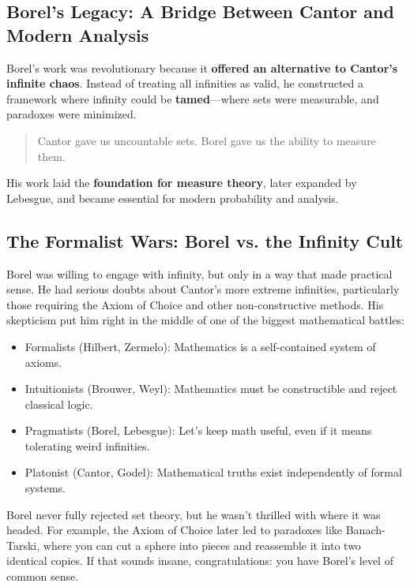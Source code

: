 \subsection{Borel’s Legacy: A Bridge Between Cantor and Modern Analysis}

Borel’s work was revolutionary because it \textbf{offered an alternative to Cantor’s infinite chaos}. Instead of treating all infinities as valid, he constructed a framework where infinity could be \textbf{tamed}—where sets were measurable, and paradoxes were minimized.

\begin{quote}
Cantor gave us uncountable sets.  
Borel gave us the ability to measure them.
\end{quote}

His work laid the \textbf{foundation for measure theory}, later expanded by Lebesgue, and became essential for modern probability and analysis.

\subsection{The Formalist Wars: Borel vs. the Infinity Cult}

Borel was willing to engage with infinity, but only in a way that made practical sense. He had serious doubts about Cantor’s more extreme infinities, particularly those requiring the Axiom of Choice and other non-constructive methods. His skepticism put him right in the middle of one of the biggest mathematical battles:

\begin{itemize}
    \item Formalists (Hilbert, Zermelo): Mathematics is a self-contained system of axioms.
    \item Intuitionists (Brouwer, Weyl): Mathematics must be constructible and reject classical logic.
    \item Pragmatists (Borel, Lebesgue): Let’s keep math useful, even if it means tolerating weird infinities.
    \item Platonist (Cantor, Godel): Mathematical truths exist independently of formal systems.
\end{itemize}

Borel never fully rejected set theory, but he wasn’t thrilled with where it was headed. For example, the Axiom of Choice later led to paradoxes like Banach-Tarski, where you can cut a sphere into pieces and reassemble it into two identical copies. If that sounds insane, congratulations: you have Borel’s level of common sense.

